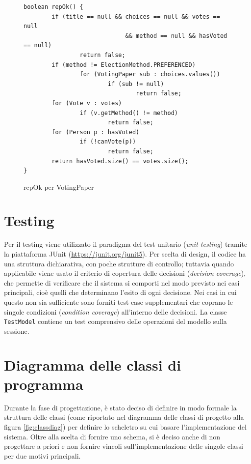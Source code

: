 \begin{figure}
	\centering
	\begin{verbatim}
boolean repOk() {
        if (title == null && choices == null && votes == null
                             && method == null && hasVoted == null)
                return false;
        if (method != ElectionMethod.PREFERENCED)
                for (VotingPaper sub : choices.values())
                        if (sub != null)
                                return false;
        for (Vote v : votes)
                if (v.getMethod() != method)
                        return false;
        for (Person p : hasVoted)
                if (!canVote(p))
                        return false;
        return hasVoted.size() == votes.size();
}
        \end{verbatim}
	\caption{repOk per VotingPaper}\label{repOk-VP}
\end{figure}




\section{Testing}\label{testing}
Per il testing viene utilizzato il paradigma del test unitario (\emph{unit testing}) tramite la piattaforma JUnit (\url{https://junit.org/junit5}). Per scelta di design, il codice ha una struttura dichiarativa, con poche strutture di controllo; tuttavia quando applicabile viene usato il criterio di copertura delle decisioni (\emph{decision coverage}), che permette di verificare che il sistema si comporti nel modo previsto nei casi principali, cioè quelli che determinano l'esito di ogni decisione. Nei casi in cui questo non sia sufficiente sono forniti test case supplementari che coprano le singole condizioni (\emph{condition coverage}) all'interno delle decisioni. La classe \verb!TestModel! contiene un test comprensivo delle operazioni del modello sulla sessione.




\section{Diagramma delle classi di programma}\label{implclassi}
Durante la fase di progettazione, è stato deciso di definire in modo formale la struttura delle classi (come riportato nel diagramma delle classi di progetto alla figura \ref{fig:classdiag}) per definire lo scheletro su cui basare l'implementazione del sistema.
Oltre alla scelta di fornire uno schema, si è deciso anche di non progettare a priori e non fornire vincoli sull'implementazione delle singole classi per due motivi principali.

